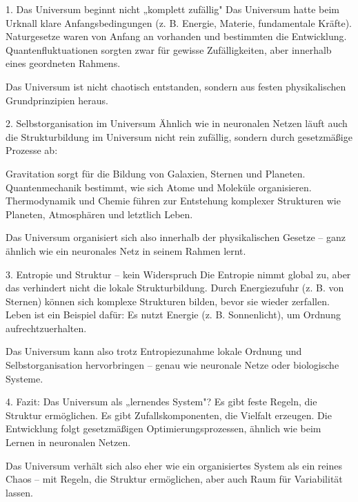\documentclass{article}
\begin{document}
	1. Das Universum beginnt nicht „komplett zufällig"
	Das Universum hatte beim Urknall klare Anfangsbedingungen (z. B. Energie, Materie, fundamentale Kräfte).
	Naturgesetze waren von Anfang an vorhanden und bestimmten die Entwicklung.
	Quantenfluktuationen sorgten zwar für gewisse Zufälligkeiten, aber innerhalb eines geordneten Rahmens.
	
	Das Universum ist nicht chaotisch entstanden, sondern aus festen physikalischen Grundprinzipien heraus.
	
	2. Selbstorganisation im Universum
	Ähnlich wie in neuronalen Netzen läuft auch die Strukturbildung im Universum nicht rein zufällig, sondern durch gesetzmäßige Prozesse ab:
	
	Gravitation sorgt für die Bildung von Galaxien, Sternen und Planeten.
	Quantenmechanik bestimmt, wie sich Atome und Moleküle organisieren.
	Thermodynamik und Chemie führen zur Entstehung komplexer Strukturen wie Planeten, Atmosphären und letztlich Leben.
	
	Das Universum organisiert sich also innerhalb der physikalischen Gesetze – ganz ähnlich wie ein neuronales Netz in seinem Rahmen lernt.
	
	3. Entropie und Struktur – kein Widerspruch
	Die Entropie nimmt global zu, aber das verhindert nicht die lokale Strukturbildung.
	Durch Energiezufuhr (z. B. von Sternen) können sich komplexe Strukturen bilden, bevor sie wieder zerfallen.
	Leben ist ein Beispiel dafür: Es nutzt Energie (z. B. Sonnenlicht), um Ordnung aufrechtzuerhalten.
	
	Das Universum kann also trotz Entropiezunahme lokale Ordnung und Selbstorganisation hervorbringen – genau wie neuronale Netze oder biologische Systeme.
	
	4. Fazit: Das Universum als „lernendes System"?
	Es gibt feste Regeln, die Struktur ermöglichen.
	Es gibt Zufallskomponenten, die Vielfalt erzeugen.
	Die Entwicklung folgt gesetzmäßigen Optimierungsprozessen, ähnlich wie beim Lernen in neuronalen Netzen.
	
	Das Universum verhält sich also eher wie ein organisiertes System als ein reines Chaos – mit Regeln, die Struktur ermöglichen, aber auch Raum für Variabilität lassen.
	
\end{document}
